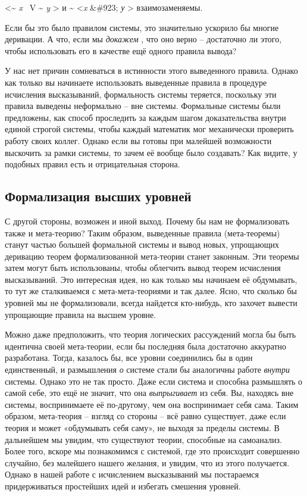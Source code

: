 \documentclass[../main.tex]{subfiles}
\begin{document}
\textless{}\textbf{\textasciitilde{}} \emph{x~} V \textbf{\textasciitilde{}} \emph{y} \textgreater{} и \textbf{\textasciitilde{}} \textless{}\emph{x} \&\#923; \emph{у} \textgreater{} взаимозаменяемы.

Если бы это было правилом системы, это значительно ускорило бы многие деривации. А что, если мы \emph{докажем} , что оно верно \--- достаточно ли этого, чтобы использовать его в качестве ещё одного правила вывода?

У нас нет причин сомневаться в истинности этого выведенного правила. Однако как только вы начинаете использовать выведенные правила в процедуре исчисления высказываний, формальность системы теряется, поскольку эти правила выведены неформально \--- вне системы. Формальные системы были предложены, как способ проследить за каждым шагом доказательства внутри единой строгой системы, чтобы каждый математик мог механически проверить работу своих коллег. Однако если вы готовы при малейшей возможности выскочить за рамки системы, то зачем её вообще было создавать? Как видите, у подобных правил есть и отрицательная сторона.


\subsection{Формализация высших уровней}

С другой стороны, возможен и иной выход. Почему бы нам не формализовать также и мета-теорию? Таким образом, выведенные правила (мета-теоремы) станут частью большей формальной системы и вывод новых, упрощающих деривацию теорем формализованной мета-теории станет законным. Эти теоремы затем могут быть использованы, чтобы облегчить вывод теорем исчисления высказываний. Это интересная идея, но как только мы начинаем её обдумывать, то тут же сталкиваемся с мета-мета-теориями и так далее. Ясно, что сколько бы уровней мы не формализовали, всегда найдется кто-нибудь, кто захочет вывести упрощающие правила на высшем уровне.

Можно даже предположить, что теория логических рассуждений могла бы быть идентична своей мета-теории, если бы последняя была достаточно аккуратно разработана. Тогда, казалось бы, все уровни соединились бы в один единственный, и размышления \emph{о} системе стали бы аналогичны работе \emph{внутри} системы. Однако это не так просто. Даже если система и способна размышлять о самой себе, это ещё не значит, что она \emph{выпрыгивает} из себя. Вы, находясь вне системы, воспринимаете её по-другому, чем она воспринимает себя сама. Таким образом, мета-теория \--- взгляд со стороны \--- всё равно существует, даже если теория и может «обдумывать себя саму», не выходя за пределы системы. В дальнейшем мы увидим, что существуют теории, способные на самоанализ. Более того, вскоре мы познакомимся с системой, где это происходит совершенно случайно, без малейшего нашего желания, и увидим, что из этого получается. Однако в нашей работе с исчислением высказываний мы постараемся придерживаться простейших идей и избегать смешения уровней.
\end{document}
